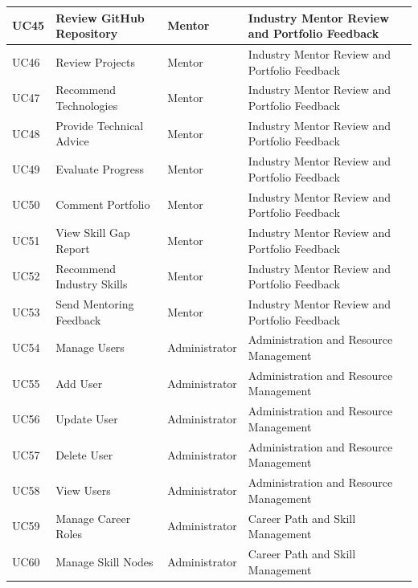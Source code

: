 \begin{longtable}{|>{\centering\arraybackslash}m{0.8cm}|>{\raggedright\arraybackslash}m{3.0cm}|>{\raggedright\arraybackslash}m{2.4cm}|>{\raggedright\arraybackslash}m{4.8cm}|}
UC45 & Review GitHub Repository & Mentor & Industry Mentor Review and Portfolio Feedback \\
\hline

UC46 & Review Projects & Mentor & Industry Mentor Review and Portfolio Feedback \\
\hline

UC47 & Recommend Technologies & Mentor & Industry Mentor Review and Portfolio Feedback \\
\hline

UC48 & Provide Technical Advice & Mentor & Industry Mentor Review and Portfolio Feedback \\
\hline

UC49 & Evaluate Progress & Mentor & Industry Mentor Review and Portfolio Feedback \\
\hline

UC50 & Comment Portfolio & Mentor & Industry Mentor Review and Portfolio Feedback \\
\hline

UC51 & View Skill Gap Report & Mentor & Industry Mentor Review and Portfolio Feedback \\
\hline

UC52 & Recommend Industry Skills & Mentor & Industry Mentor Review and Portfolio Feedback \\
\hline

UC53 & Send Mentoring Feedback & Mentor & Industry Mentor Review and Portfolio Feedback \\
\hline

UC54 & Manage Users & Administrator & Administration and Resource Management \\
\hline

UC55 & Add User & Administrator & Administration and Resource Management \\
\hline

UC56 & Update User & Administrator & Administration and Resource Management \\
\hline

UC57 & Delete User & Administrator & Administration and Resource Management \\
\hline

UC58 & View Users & Administrator & Administration and Resource Management \\
\hline

UC59 & Manage Career Roles & Administrator & Career Path and Skill Management \\
\hline

UC60 & Manage Skill Nodes & Administrator & Career Path and Skill Management \\
\hline


\end{longtable}
